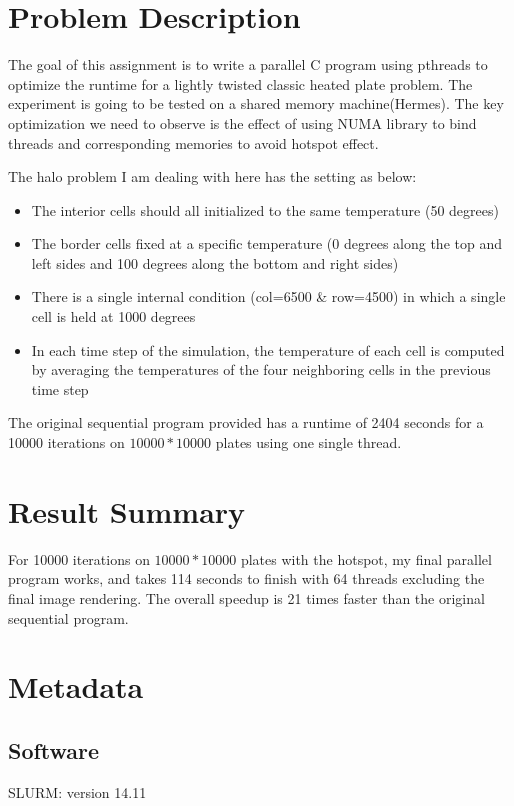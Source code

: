 \documentclass{cs4444}
\begin{document}
\maketitle

\section{Problem Description}
The goal of this assignment is to write a parallel C program using pthreads to optimize the runtime for a lightly twisted classic heated plate problem. The experiment is going to be tested on a shared memory machine(Hermes). The key optimization we need to observe is the effect of using NUMA library to bind threads and corresponding memories to avoid hotspot effect.

The halo problem I am dealing with here has the setting as below:
	\begin{itemize}
	\item The interior cells should all initialized to the same temperature (50 degrees)
	\item The border cells fixed at a specific temperature (0 degrees along the top and left sides and 100 degrees along the bottom and right sides)
	\item There is a single internal condition (col=6500 \& row=4500) in which a single cell is held at 1000 degrees
	\item  In each time step of the simulation, the temperature of each cell is computed by averaging the temperatures of the four neighboring cells in the previous time step
	\end{itemize}
	
The original sequential program provided has a runtime of 2404 seconds for a 10000 iterations on $10000 * 10000$ plates using one single thread.

\section{Result Summary}
For 10000 iterations on $10000 * 10000$ plates with the hotspot, my final parallel program works, and takes 114 seconds to finish with 64 threads excluding the final image rendering. The overall speedup is 21 times faster than the original sequential program.

\section{Metadata}
\subsection{Software}
	SLURM: version 14.11
	
\end{document}
